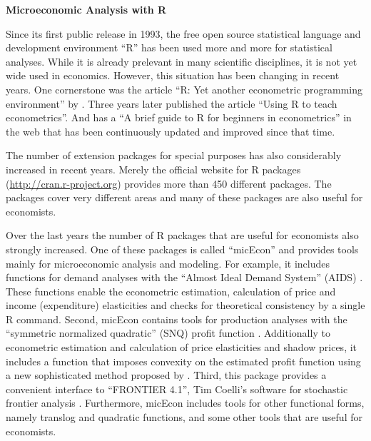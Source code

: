 \documentclass[12pt,english]{article}
\begin{document}
\begin{center}\textbf{\LARGE Microeconomic Analysis with R}\end{center}{\LARGE \par}

\bigskip

Since its first public release in 1993, the free open source statistical
language and development environment ``R'' \citep{r-project} has been used more
and more for statistical analyses. 
While it is already prelevant in many scientific disciplines, 
it is not yet wide used in economics.
However, this situation has been changing in recent years. 
One cornerstone was the article ``R: Yet another econometric programming
environment'' by \citet{cribari99}.
Three years later \citet{racine02} published the article ``Using R to teach
econometrics''. 
And \citet{arai02} has a ``A brief guide to R for beginners in econometrics''
in the web that has been continuously updated and improved since that time.

The number of extension packages for special purposes has also considerably 
increased in recent years.
Merely the official website for R packages (\url{http://cran.r-project.org})
provides more than 450 different packages.
The packages cover very different areas and many of these packages are also 
useful for economists.

Over the last years the number of R packages that are useful for economists
also strongly increased. 
One of these packages is called ``micEcon'' \citep{r-micecon} and provides
tools mainly for microeconomic analysis and modeling.
For example, it includes functions for demand analyses with the 
``Almost Ideal Demand System'' (AIDS) \citep{deaton80a}.
These functions enable the econometric estimation, calculation of price and
income (expenditure) elasticities and checks for theoretical consistency
by a single R command.
Second, micEcon contains tools for production analyses with the 
``symmetric normalized quadratic'' (SNQ) profit function
\citep{diewert87,diewert92,kohli93}.  
Additionally to econometric estimation and calculation of price elasticities
and shadow prices, it includes a function that imposes convexity on the 
estimated profit function using a new sophisticated method proposed by
\citet{koebel03}.
Third, this package provides a convenient interface to ``FRONTIER 4.1'', Tim
Coelli's software for stochastic frontier analysis \citep{coelli96}.
Furthermore, micEcon includes tools for other functional forms, namely
translog and quadratic functions, and some other tools that are useful
for economists.
\end{document}
